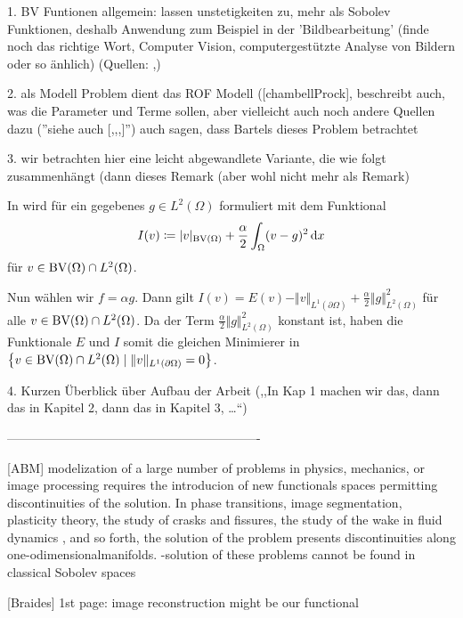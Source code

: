 1. BV Funtionen allgemein: lassen unstetigkeiten zu, mehr als Sobolev 
Funktionen, deshalb Anwendung zum Beispiel in der 'Bildbearbeitung' (finde
noch das richtige Wort, Computer Vision, computergestützte Analyse von Bildern
oder so änhlich)
(Quellen: \cite{AK06},)

2. als Modell Problem dient das ROF Modell ([chambellProck], beschreibt auch,
was die Parameter und Terme sollen, aber vielleicht auch noch andere Quellen 
dazu (''siehe auch [,,,]'')
auch sagen, dass Bartels dieses Problem betrachtet

3. wir betrachten hier eine leicht abgewandlete Variante, die wie folgt
zusammenhängt (dann dieses Remark (aber wohl nicht mehr als Remark)

\begin{remark}
  In \cite[Kapitel~10.1.3]{Bar15} wird  für ein
  gegebenes $g\in L^2(\Omega)$ formuliert
  mit dem Funktional 
  \begin{align*}
    I(v)\coloneqq |v|_{\textup{BV}(\Omega)} + \frac{\alpha}{2}\int_\Omega (v-g)^2\,\mathrm{d}x
  \end{align*}
  für $v\in \textup{BV}(\Omega)\cap L^2(\Omega)$.

  Nun wählen wir $f = \alpha g$. Dann gilt
  $I(v) = E(v) - \Vert v\Vert_{L^1(\partial \Omega)}+ 
  \frac{\alpha}{2}\Vert g\Vert_{L^2(\Omega)}^2$ für alle 
  $v\in \textup{BV}(\Omega)\cap L^2(\Omega)$. Da der Term $\frac{\alpha}{2}\Vert
  g\Vert_{L^2(\Omega)}^2$ konstant ist, haben die Funktionale $E$ und $I$ somit
  die gleichen Minimierer in $\left\{v\in\textup{BV}(\Omega)\cap L^2(\Omega)\mid 
  \Vert v\Vert_{L^1(\partial\Omega)}=0\right\}$.
\end{remark}

4. Kurzen Überblick über Aufbau der Arbeit (,,In Kap 1 machen wir das, dann das
in Kapitel 2, dann das in Kapitel 3, \ldots``)

-------------------------------------------------------------

[ABM] modelization of a large number of problems in physics, mechanics, or image
processing requires the introducion of new functionals spaces permitting
discontinuities of the solution. In phase transitions, image segmentation,
plasticity theory, the study of crasks and fissures, the study of the wake in
fluid dynamics , and so forth, the solution of the problem presents
discontinuities along one-odimensionalmanifolds.
-solution of these problems cannot be found in classical Sobolev spaces

[Braides] 1st page: image reconstruction might be our functional\\


